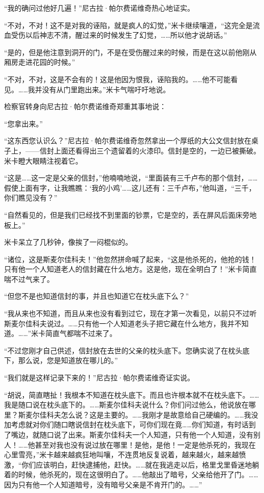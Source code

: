 \par “我的确问过他好几遍！”尼古拉·帕尔费诺维奇热心地证实。
\par “不对，不对！这不是对我的诬陷，就是疯人的幻觉，”米卡继续嚷道，“这完全是流血受伤以后神志不清，醒过来的时候发生了幻觉，……所以他才说胡话。”
\par “是的，但是他注意到洞开的门，不是在受伤醒过来的时候，而是在这以前他刚从厢房走进花园的时候。”
\par “不对，不对，这是不会有的！这是他因为恨我，诬陷我的。……他不可能看见。……我并没有从门里跑出来。”米卡气喘吁吁地说。
\par 检察官转身向尼古拉·帕尔费诺维奇郑重其事地说：
\par “您拿出来。”
\par “这东西您认识么？”尼古拉·帕尔费诺维奇忽然拿出一个厚纸的大公文信封放在桌子上，——信封上面还看得出三个遗留着的火漆印。信封是空的，一边已被撕破。米卡瞪大眼睛注视着它。
\par “这是……这一定是父亲的信封，”他喃喃地说，“里面装有三千卢布的那个信封，……假使上面有字，让我瞧瞧：‘我的小鸡’……这儿还有：三千卢布，”他叫道，“三千，你们瞧见没有？”
\par “自然看见的，但是我们已经找不到里面的钞票，它是空的，丢在屏风后面床旁地板上。”
\par 米卡呆立了几秒钟，像挨了一闷棍似的。
\par “诸位，这是斯麦尔佳科夫！”他忽然拼命喊了起来，“这是他杀死的，他抢的钱！只有他一个人知道老人的信封藏在什么地方。这是他，现在全明白了！”米卡简直喘不过气来了。
\par “但您不是也知道信封的事，并且也知道它在枕头底下么？”
\par “我从来也不知道，而且从来也没有看到过它，现在才第一次看见，以前只不过听斯麦尔佳科夫说过。……只有他一个人知道老头子把它藏在什么地方，我并不知道。……”米卡简直气都喘不过来了。
\par “不过您刚才自己供述，信封放在去世的父亲的枕头底下。您确实说了在枕头底下，那么说，您是知道放在哪儿的。”
\par “我们就是这样记录下来的！”尼古拉·帕尔费诺维奇证实说。
\par “胡说，简直瞎扯！我根本不知道在枕头底下。而且也许根本就不在枕头底下。……我是随口说在枕头底下的。……斯麦尔佳科夫说什么？你们问过他么，他说放在哪里？斯麦尔佳科夫怎么说？这是主要的。……我刚才是故意给自己硬编的。……我没加考虑就对你们随口瞎说信封在枕头底下，可你们现在竟……你们知道，有时话到了嘴边，就随口说了出来。斯麦尔佳科夫一个人知道，只有他一个人知道，没有别人！……他甚至对我也没有说过放在哪里！是他，是他！一定是他杀死的，我现在心里雪亮，”米卡越来越疯狂地叫嚷，不连贯地反复说着，越来越火，越来越愤激，“你们应该明白，赶快逮捕他，赶快。……就在我逃走以后，格里戈里昏迷地躺着的时候，他杀死的，现在这很明白了。……他敲出了暗号，父亲给他开了门。……因为只有他一个人知道暗号，没有暗号父亲是不肯开门的。……”
